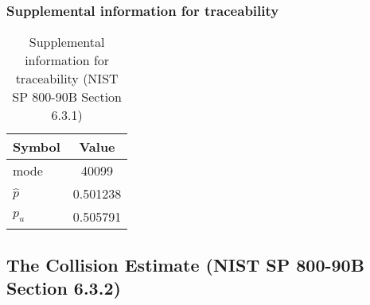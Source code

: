 \documentclass[a3paper,xelatex,english]{bxjsarticle}
\begin{document}
\subsubsection{Supplemental information for traceability}
\renewcommand{\arraystretch}{1.8}
\begin{table}[h]
\caption{Supplemental information for traceability (NIST SP 800-90B Section 6.3.1)}
\begin{center}
\begin{tabular}{|l|c|}
\hline 
\rowcolor{anotherlightblue} %
Symbol				& Value \\ \hline 
mode				&    40099\\ \hline 
$\hat{p}$ 			& 0.501238\\ \hline
$p_u$				& 0.505791\\ \hline
\end{tabular}
\end{center}
\end{table}
\renewcommand{\arraystretch}{1.4}
\clearpage
\subsection{The Collision Estimate (NIST SP 800-90B Section 6.3.2)}\label{sec:Binary632}
\end{document}

